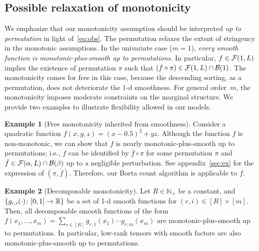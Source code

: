\documentclass[12pt]{article}
\theoremstyle{definition}
\newtheorem{example}{Example}
\begin{document}
{\color{blue}\subsection{Possible relaxation of monotonicity} 

We emphasize that our monotonicity assumption should be interpreted \emph{up to permutation} in light of~\eqref{eq:obs}. The permutation relaxes the extent of stringency in the monotonic assumptions. In the univariate case ($m=1$), \emph{every smooth function is monotonic-plus-smooth up to permutations.} In particular, $f\in \mathcal{F}(1, L)$ implies the existence of permutation $\pi$ such that $(f\circ \pi) \in \mathcal{F}(1, L)\cap \mathcal{B}(1)$. The monotonicity comes for free in this case, because the descending sorting, as a permutation, does not deteriorate the 1-d smoothness. For general order~$m$, the monotonicity imposes moderate constraints on the marginal structure. We provide two examples to illustrate flexibility allowed in our models. 
  
 \begin{example}[Free monotonicity inherited from smoothness]\label{ex:free}Consider a quadratic function $f(x,y,z)=(x-0.5)^2+yz$. Although the function $f$ is non-monotonic, we can show that $f$ is nearly monotonic-plus-smooth up to permutations; i.e., $f$ can be identified by $\bar f\circ \pi$ for some permutation $\pi$ and $\bar f \in \mathcal{F}(\alpha,L)\cap \mathcal{B}(\beta)$ up to a negligible perturbation. See appendix~\ref{sec:ex} for the expression of $(\pi, \bar f)$. Therefore, our Borta count algorithm is applicable to $f$.  
 \end{example}
 
  \begin{example}[Decomposable monotonicity] Let $R\in\mathbb{N}_{+}$ be a constant, and $\{g_{r,i}(\cdot) \colon[0,1]\to \mathbb{R}\}$ be a set of 1-d smooth functions for $(r,i)\in[R]\times [m]$. Then, all decomposable smooth functions of the form 
$
  f(x_1,\ldots,x_m)=\sum_{r\in[R]}g_{r,1}(x_1)\cdots g_{r,m}(x_m)
$
are monotonic-plus-smooth up to permutations. In particular, low-rank tensors with smooth factors are also monotonic-plus-smooth up to permutations.
\end{example}

}
\end{document}
